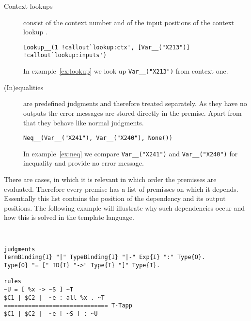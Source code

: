 \begin{description}
\item[Context lookups] consist of the context number
   and of the input positions of the context
  lookup .

\begin{example}
\begin{verbatim}
Lookup__(1 !callout`lookup:ctx', [Var__("X213")] !callout`lookup:inputs')
\end{verbatim}
\label{ex:lookup}
\end{example}

  In example~\ref{ex:lookup} we look up \verb|Var__("X213")| from
  context one.

\item[(In)equalities] are predefined judgments and therefore treated
  separately. As they have no outputs the error messages are stored
  directly in the premise. Apart from that they behave like normal
  judgments.

\begin{example}
\begin{verbatim}
Neq__(Var__("X241"), Var__("X240"), None())
\end{verbatim}
\label{ex:neq}
\end{example}

  In example~\ref{ex:neq} we compare \verb|Var__("X241")| and
  \verb|Var__("X240")| for inequality and provide no error message.
\end{description}

There are cases, in which it is relevant in which order the premisses
are evaluated. Therefore every premise has a list of premisses on
which it depends. Essentially this list contains the position of the
dependency and its output positions. The following example will
illustrate why such dependencies occur and how this is solved in the
template language.

\begin{example}{~}
\begin{verbatim}
judgments
TermBinding{I} "|" TypeBinding{I} "|-" Exp{I} ":" Type{O}.
Type{O} "= [" ID{I} "->" Type{I} "]" Type{I}.

rules
~U = [ %x -> ~S ] ~T
$C1 | $C2 |- ~e : all %x . ~T 
============================== T-Tapp
$C1 | $C2 |- ~e [ ~S ] : ~U
\end{verbatim}
\label{ex:premise-dependencies}
\end{example}

